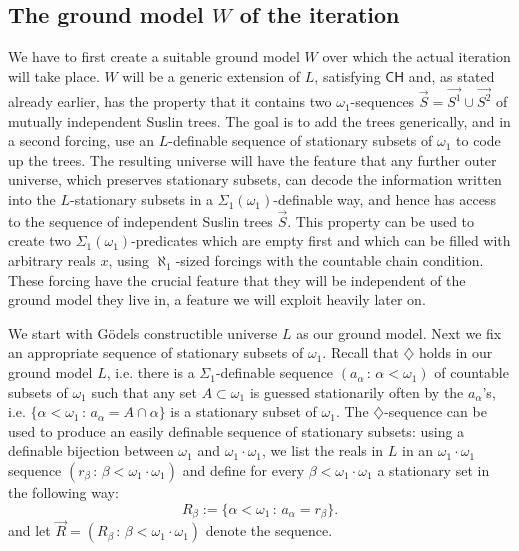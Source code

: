\documentclass[a4paper,11pt]{article}
\newcommand{\CH}{\mathsf{CH}}
\begin{document}
\subsection{The ground model $W$ of the iteration}
We have to first create a suitable ground model $W$ over which the actual iteration will take place. $W$ will be a generic extension of $L$, satisfying $\CH$ and, as stated already earlier, has the property that it contains two $\omega_1$-sequences $\vec{S}=\vec{S^1} \cup \vec{S^2}$ of mutually independent Suslin trees. 
The goal is to add the trees generically, and in a second forcing, use an $L$-definable sequence of stationary subsets of $\omega_1$ to code up the trees. The resulting universe will have the feature that any further outer universe, which preserves stationary subsets, can decode the information written into the $L$-stationary subsets in a $\Sigma_1(\omega_1)$-definable way, and hence has access to the sequence of independent Suslin trees $\vec{S}$. This property can be used to create two $\Sigma_1(\omega_1)$-predicates which are empty first and which can be filled with arbitrary reals $x$, using $\aleph_1$-sized forcings with the countable chain condition. These forcing have the crucial feature that they will be independent of the ground model they live in, a feature we will exploit heavily later on.

We start with G\"odels constructible universe $L$ as our 
ground model.
Next we fix an appropriate sequence of stationary subsets of $\omega_1$.
Recall that $\diamondsuit$ holds in our ground model $L$, i.e. there is a 
$\Sigma_1$-definable sequence $(a_{\alpha} \, : \, \alpha < \omega_1)$ of countable subsets of $\omega_1$
such that any set $A \subset \omega_1$ is guessed stationarily often by the $a_{\alpha}$'s, i.e.
$\{ \alpha < \omega_1 \, : \, a_{\alpha}= A \cap \alpha \}$ is a stationary subset of $\omega_1$. 
The $\diamondsuit$-sequence can be used to produce an easily definable sequence of stationary subsets: using a definable bijection between $\omega_1$ and $\omega_1 \cdot \omega_1$, we list the reals in $L$ in an $\omega_1 \cdot \omega_1$ sequence $(r_{\beta} \, : \, \beta < \omega_1 \cdot \omega_1)$ and define for every $\beta < \omega_1 \cdot \omega_1$
a stationary set in the following way:
$$R_{\beta} := \{ \alpha < \omega_1  \, : \, a_{\alpha}= r_{\beta}   \}.$$
and let $\vec{R}= (R_{\beta} \, : \, \beta < \omega_1 \cdot \omega_1)$ denote the sequence.
\end{document}
